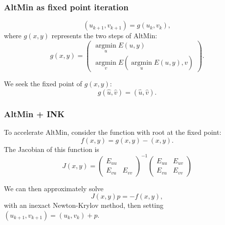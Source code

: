 \documentclass{beamer}
\DeclareMathOperator*{\argmin}{argmin}
\begin{document}
\begin{frame}
\frametitle{AltMin as fixed point iteration}

\begin{equation*}
	(u_{k+1}, v_{k+1}) = g(u_k,v_k),
\end{equation*}
where $g(x,y)$ represents the two steps of AltMin:
\begin{equation*}
	g(x,y) = \begin{pmatrix} \argmin\limits_u E(u, y) \\ \argmin\limits_v E(\argmin\limits_u E(u,y), v) \end{pmatrix}.
\end{equation*}

We seek the fixed point of $g(x,y)$:
\begin{equation*}
	g(\hat{u}, \hat{v}) = (\hat{u}, \hat{v}).
\end{equation*}

\end{frame}

\begin{frame}
\frametitle{AltMin + INK}

To accelerate AltMin, consider the function with root at the fixed point:
\begin{equation*}
	f(x,y) = g(x,y) - (x,y).
\end{equation*}
The Jacobian of this function is
\begin{equation*}
	J(x,y) = \begin{pmatrix} E_{uu} \\ E_{vu} & E_{vv} \end{pmatrix}^{-1} \begin{pmatrix} E_{uu} & E_{uv} \\ E_{vu} & E_{vv} \end{pmatrix}
\end{equation*}

We can then approximately solve
\begin{equation*}
	J(x,y) p = -f(x,y),
\end{equation*}
with an inexact Newton-Krylov method,
then setting $(u_{k+1}, v_{k+1}) = (u_k, v_k) + p$.

\end{frame}
\end{document}
